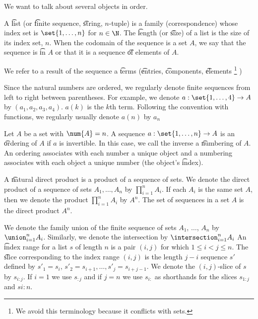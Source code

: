 
We want to talk about several objects in order.


A \t{list} (or \t{finite sequence}, \t{string}, \t{$n$-tuple}) is a family (correspondence) whose index set is $\set{1, \dots, n}$ for $n \in \N$.
The \t{length} (or \t{size}) of a list is the size of its index set, $n$.
When the codomain of the sequence is a set $A$, we say that the sequence is \t{in} $A$ or that it is a sequence \t{of} elements of $A$.

We refer to a result of the sequence a \t{terms} (\t{entries}, \t{components}, \t{elements}
  \ifhmode\unskip\fi\footnote{
We avoid this terminology because it conflicts with sets.
  }
)


Since the natural numbers are ordered, we regularly denote finite sequences from left to right between parentheses.
For example, we denote $a: \set{1, \dots, 4} \to A$ by $(a_1, a_2, a_3, a_4)$.
$a(k)$ is the $k$th term.
Following the convention with functions, we regularly usually denote $a(n)$ by $a_n$

Let $A$ be a set with $\num{A} = n$.
A sequence $a: \set{1, \dots, n} \to A$ is an \t{ordering} of $A$ if $a$ is invertible.
In this case, we call the inverse a \t{numbering} of $A$.
An ordering associates with each number a unique object and a numbering associates with each object a unique number (the object's \t{index}).


A \t{natural direct product} is a product of a sequence of sets.
We denote the direct product of a sequence of sets $A_1, \dots, A_n$ by $\prod_{i = 1}^{n} A_i$.
If each $A_i$ is the same set $A$, then we denote the product $\prod_{i = 1}^{n} A_i$ by $A^n$.
The set of sequences in a set $A$ is the direct product $A^n$.

We denote the family union of the finite sequence of sets $A_1$, $\dots$, $A_n$ by $\union_{i = 1}^{n} A_i$.
Similarly, we denote the intersection by $\intersection_{i = 1}^{n} A_i$
An \t{index range} for a list $s$ of length $n$ is a pair $(i, j)$ for which $1 \leq i < j \leq n$.
The \t{slice} corresponding to the index range $(i,j)$ is the length $j-i$ sequence $s'$ defined by $s'_1 = s_{i}$, $s'_2 = s_{i+1}, \dots, s'_{j} = s_{i + j-1}$.
We denote the $(i,j)$-slice of $s$ by $s_{i:j}$.
If $i = 1$ we use $s_{:j}$ and if $j = n$ we use $s_{i:}$ as shorthands for the slices $s_{1:j}$ and $s{i:n}$.
